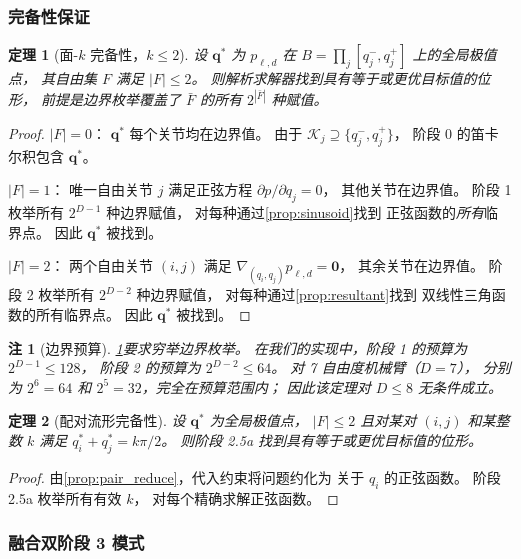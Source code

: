 \documentclass[journal]{IEEEtran}
\newtheorem{theorem}{定理}
\newtheorem{remark}{注}
\begin{document}
\subsubsection{完备性保证}\label{sec:completeness}

\begin{theorem}[面-$k$ 完备性，$k \leq 2$]\label{thm:face_complete}
设 $\bm{q}^*$ 为 $p_{\ell,d}$ 在
$B = \prod_j [q_j^-,q_j^+]$ 上的全局极值点，
其自由集 $F$ 满足 $|F|\leq 2$。
则解析求解器找到具有等于或更优目标值的位形，
前提是边界枚举覆盖了 $\bar F$ 的所有 $2^{|\bar F|}$ 种赋值。
\end{theorem}
\begin{proof}
$|F|=0$：
$\bm{q}^*$ 每个关节均在边界值。
由于 $\mathcal{K}_j \supseteq \{q_j^-,q_j^+\}$，
阶段 0 的笛卡尔积包含 $\bm{q}^*$。

$|F|=1$：
唯一自由关节 $j$ 满足正弦方程
$\partial p/\partial q_j = 0$，
其他关节在边界值。
阶段 1 枚举所有 $2^{D-1}$ 种边界赋值，
对每种通过\cref{prop:sinusoid}找到
正弦函数的\emph{所有}临界点。
因此 $\bm{q}^*$ 被找到。

$|F|=2$：
两个自由关节 $(i,j)$ 满足
$\nabla_{(q_i,q_j)} p_{\ell,d} = \bm{0}$，
其余关节在边界值。
阶段 2 枚举所有 $2^{D-2}$ 种边界赋值，
对每种通过\cref{prop:resultant}找到
双线性三角函数的所有临界点。
因此 $\bm{q}^*$ 被找到。
\end{proof}

\begin{remark}[边界预算]\label{rem:budget}
\cref{thm:face_complete}要求穷举边界枚举。
在我们的实现中，阶段 1 的预算为 $2^{D-1} \leq 128$，
阶段 2 的预算为 $2^{D-2} \leq 64$。
对 7 自由度机械臂（$D=7$），
分别为 $2^6=64$ 和 $2^5=32$，完全在预算范围内；
因此该定理对 $D\leq 8$ 无条件成立。
\end{remark}

\begin{theorem}[配对流形完备性]\label{thm:pair_complete}
设 $\bm{q}^*$ 为全局极值点，
$|F| \leq 2$ 且对某对 $(i,j)$ 和某整数 $k$
满足 $q_i^* + q_j^* = k\pi/2$。
则阶段 2.5a 找到具有等于或更优目标值的位形。
\end{theorem}
\begin{proof}
由\cref{prop:pair_reduce}，代入约束将问题约化为
关于 $q_i$ 的正弦函数。
阶段 2.5a 枚举所有有效 $k$，
对每个精确求解正弦函数。
\end{proof}


\subsubsection{融合双阶段 3 模式}\label{sec:dual_phase3}
\end{document}
